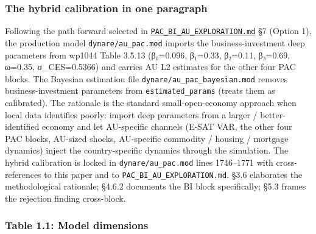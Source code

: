 \documentclass[
]{article}
\begin{document}
\subsubsection{The hybrid calibration in one
paragraph}\label{the-hybrid-calibration-in-one-paragraph}

Following the path forward selected in
\href{../PAC_BI_AU_EXPLORATION.md}{\texttt{PAC\_BI\_AU\_EXPLORATION.md}}
§7 (Option 1), the production model \texttt{dynare/au\_pac.mod} imports
the business-investment deep parameters from wp1044 Table 3.5.13
(β₀=0.096, β₁=0.33, β₂=0.11, β₃=0.69, ω=0.35, σ\_CES=0.5366) and carries
AU L2 estimates for the other four PAC blocks. The Bayesian estimation
file \texttt{dynare/au\_pac\_bayesian.mod} removes business-investment
parameters from \texttt{estimated\_params} (treats them as calibrated).
The rationale is the standard small-open-economy approach when local
data identifies poorly: import deep parameters from a larger /
better-identified economy and let AU-specific channels (E-SAT VAR, the
other four PAC blocks, AU-sized shocks, AU-specific commodity / housing
/ mortgage dynamics) inject the country-specific dynamics through the
simulation. The hybrid calibration is locked in
\texttt{dynare/au\_pac.mod} lines 1746--1771 with cross-references to
this paper and to \texttt{PAC\_BI\_AU\_EXPLORATION.md}. §3.6 elaborates
the methodological rationale; §4.6.2 documents the BI block
specifically; §5.3 frames the rejection finding cross-block.

\subsubsection{Table 1.1: Model
dimensions}\label{table-1.1-model-dimensions}
\end{document}
